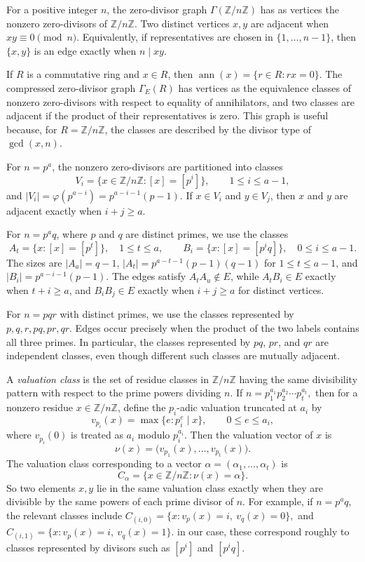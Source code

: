 \documentclass[12pt]{article}
\theoremstyle{definition}
\begin{document}
For a positive integer $n$, the zero-divisor graph $\Gamma(\mathbb{Z}/n\mathbb{Z})$ has as vertices the nonzero zero-divisors of $\mathbb{Z}/n\mathbb{Z}$.  Two distinct vertices $x,y$ are adjacent when $xy\equiv 0\pmod n$.  Equivalently, if representatives are chosen in $\{1,\ldots,n-1\}$, then $\{x,y\}$ is an edge exactly when $n\mid xy$.

\medskip

If $R$ is a commutative ring and $x\in R$, then $\operatorname{ann}(x)=\{r\in R:rx=0\}$.  The compressed zero-divisor graph $\Gamma_E(R)$ has vertices as the equivalence classes of nonzero zero-divisors with respect to equality of annihilators, and two classes are adjacent if the product of their representatives is zero.  This graph is useful because, for $R=\mathbb{Z}/n\mathbb{Z}$, the classes are described by the divisor type of $\gcd(x,n)$.

\medskip

For $n=p^a$, the nonzero zero-divisors are partitioned into classes
$$
V_i=\{x\in \mathbb{Z}/n\mathbb{Z}:[x]=[p^i]\},\qquad 1\leq i\leq a-1,
$$
and $|V_i|=\varphi(p^{a-i})=p^{a-i-1}(p-1)$.  If $x\in V_i$ and $y\in V_j$, then $x$ and $y$ are adjacent exactly when $i+j\geq a$.

\medskip

For $n=p^a q$, where $p$ and $q$ are distinct primes, we use the classes
$$
A_t=\{x:[x]=[p^t]\},\quad 1\leq t\leq a,
\qquad
B_i=\{x:[x]=[p^i q]\},\quad 0\leq i\leq a-1.
$$
The sizes are $|A_a|=q-1$, $|A_t|=p^{a-t-1}(p-1)(q-1)$ for $1\leq t\leq a-1$, and $|B_i|=p^{a-i-1}(p-1)$.  The edges satisfy $A_tA_u\notin E$, while $A_tB_i\in E$ exactly when $t+i\geq a$, and $B_iB_j\in E$ exactly when $i+j\geq a$ for distinct vertices.

\medskip

For $n=pqr$ with distinct primes, we use the classes represented by $p,q,r,pq,pr,qr$.  Edges occur precisely when the product of the two labels contains all three primes.  In particular, the classes represented by $pq$, $pr$, and $qr$ are independent classes, even though different such classes are mutually adjacent.



A \textit{valuation class} is the set of residue classes in $\mathbb{Z}/n\mathbb{Z}$ having the same divisibility pattern with respect to the prime powers dividing $n$. If $n=p_1^{a_1}p_2^{a_2}\cdots p_t^{a_t},$ then for a nonzero residue $x\in \mathbb{Z}/n\mathbb{Z}$, define the $p_i$-adic valuation truncated at $a_i$ by
 $$
v_{p_i}(x)=\max\{e: p_i^e\mid x\},\qquad 0\leq e\leq a_i,
$$
where $v_{p_i}(0)$ is treated as $a_i$ modulo $p_i^{a_i}$. Then the valuation vector of $x$ is
 $$
\nu(x)=\bigl(v_{p_1}(x),\ldots,v_{p_t}(x)\bigr).
$$
The valuation class corresponding to a vector $\alpha=(\alpha_1,\ldots,\alpha_t)$ is
$$
C_\alpha=\{x\in \mathbb{Z}/n\mathbb{Z}: \nu(x)=\alpha\}.
$$
So two elements $x,y$ lie in the same valuation class exactly when they are divisible by the same powers of each prime divisor of $n$. For example, if $n=p^aq$, the relevant classes include
$
C_{(i,0)}=\{x:v_p(x)=i,\ v_q(x)=0\},
$
and
$
C_{(i,1)}=\{x:v_p(x)=i,\ v_q(x)=1\}.
$
 in our case, these correspond roughly to classes represented by divisors such as $[p^i]$ and $[p^iq]$.
\end{document}
